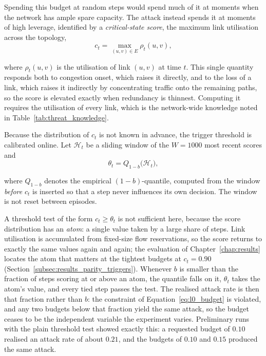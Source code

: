 Spending this budget at random steps would spend much of it at moments when the network
has ample spare capacity. The attack instead spends it at moments of high leverage,
identified by a \emph{critical-state score}, the maximum link utilisation across the
topology,
\begin{equation}
  c_t = \max_{(u,v) \in E} \rho_t(u,v),
  \label{eq:critical_score}
\end{equation}

\noindent where $\rho_t(u,v)$ is the utilisation of link $(u,v)$ at time $t$. This
single quantity responds both to congestion onset, which raises it directly, and to the
loss of a link, which raises it indirectly by concentrating traffic onto the remaining
paths, so the score is elevated exactly when redundancy is thinnest. Computing it
requires the utilisation of every link, which is the network-wide knowledge noted in
Table~\ref{tab:threat_knowledge}.

Because the distribution of $c_t$ is not known in advance, the trigger threshold is
calibrated online. Let $\mathcal{H}_t$ be a sliding window of the $W = 1000$ most recent
scores and
\begin{equation}
  \theta_t = Q_{1-b}\big( \mathcal{H}_t \big),
  \label{eq:timing_threshold}
\end{equation}

\noindent where $Q_{1-b}$ denotes the empirical $(1-b)$-quantile, computed from the
window \emph{before} $c_t$ is inserted so that a step never influences its own decision.
The window is not reset between episodes.

A threshold test of the form $c_t \ge \theta_t$ is not sufficient here, because the
score distribution has an \emph{atom}: a single value taken by a large share of steps.
Link utilisation is accumulated from fixed-size flow reservations, so the score returns
to exactly the same values again and again; the evaluation of
Chapter~\ref{chap:results} locates the atom that matters at the tightest budgets at
$c_t = 0.90$ (Section~\ref{subsec:results_parity_triggers}). Whenever $b$ is smaller
than the fraction of steps scoring at or above an atom, the quantile falls on it,
$\theta_t$ takes the atom's value, and every tied step passes the test. The realised
attack rate is then that fraction rather than $b$: the constraint of
Equation~\eqref{eq:l0_budget} is violated, and any two budgets below that fraction
yield the same attack, so the budget ceases to be the independent variable the
experiment varies. Preliminary runs with the plain threshold test showed exactly this: a
requested budget of $0.10$ realised an attack rate of about $0.21$, and the budgets of
$0.10$ and $0.15$ produced the same attack.

